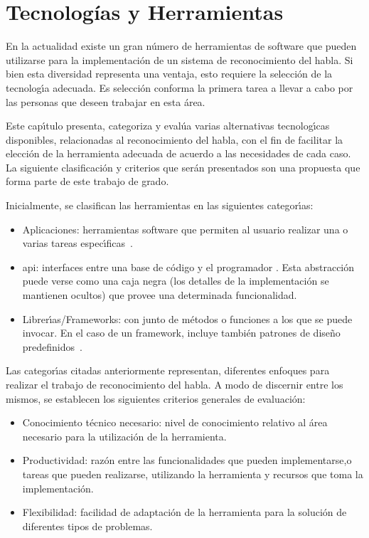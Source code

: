  \chapter{Tecnolog\'ias y Herramientas}
\label{sec:tecnologias}

En la actualidad existe un gran n\'umero de herramientas de software que pueden utilizarse para la implementaci\'on de un
sistema de reconocimiento del habla. Si bien esta diversidad representa una ventaja, esto requiere
la selecci\'on de la tecnolog{\'\i}a adecuada. Es selecci\'on conforma la primera tarea a llevar a
cabo por las personas que deseen trabajar en esta \'area.

Este cap{\'\i}tulo presenta, categoriza y eval\'ua varias alternativas tecnolog{\'\i}cas disponibles, relacionadas
al reconocimiento del habla, con el fin de facilitar la elecci\'on de la herramienta adecuada
de acuerdo a las necesidades de cada caso. La siguiente clasificaci\'on y criterios que ser\'an presentados son
una propuesta que forma parte de este trabajo de grado.

Inicialmente, se clasifican las herramientas en las siguientes categor{\'\i}as:
\begin{itemize}
	\item Aplicaciones: herramientas software que permiten al usuario realizar una o
	varias tareas \mbox{espec{\'\i}ficas \cite{GoodwillComputer}}.
    \item \gls{api}: interfaces entre una base de c\'odigo y
	el programador \cite{DoucetteOnApi}. Esta abstracci\'on puede verse como una caja negra
	(los detalles de la implementaci\'on se mantienen ocultos) que provee una determinada funcionalidad.
	\item Librer{\'\i}as/Frameworks: con junto de m\'etodos o funciones a los que se puede invocar.
	En el caso de un framework, incluye tambi\'en patrones de dise\~no
	\mbox{predefinidos \cite{FowlerInversion}}.
\end{itemize}

Las categor{\'\i}as citadas anteriormente representan, diferentes enfoques para realizar el trabajo
de reconocimiento del habla. A modo de discernir entre los mismos, se establecen
los siguientes criterios generales de evaluaci\'on:
\begin{itemize}
	\item Conocimiento t\'ecnico necesario: nivel de conocimiento relativo al \'area necesario para la
	utilizaci\'on de la herramienta. 
	\item Productividad: raz\'on entre las funcionalidades que pueden implementarse,o tareas que pueden
	realizarse, utilizando la herramienta y recursos que toma la implementaci\'on.
	\item Flexibilidad: facilidad de adaptaci\'on de la herramienta para la soluci\'on de diferentes
	tipos de problemas.
\end{itemize}

